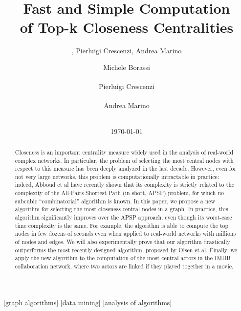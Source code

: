 \documentclass{acm_proc_article-sp}
\date{\today}
\begin{document}
\title{Fast and Simple Computation \\ of Top-k Closeness Centralities}
\author{, Pierluigi Crescenzi, Andrea Marino}

\author{
Michele Borassi\\
       \\
        Pierluigi Crescenzi\\
       \\
 Andrea Marino\\
       \\
}

\maketitle

\begin{abstract}
Closeness is an important centrality measure widely used in the analysis of real-world complex networks. In particular, the problem of selecting the  most central nodes with respect to this measure has been deeply analyzed in the last decade. However, even for not very large networks, this problem is computationally intractable in practice: indeed, Abboud et al have recently shown that its complexity is strictly related to the complexity of the All-Pairs Shortest Path (in short, APSP) problem, for which no subcubic ``combinatorial'' algorithm is known. In this paper, we propose a new algorithm for selecting the  most closeness central nodes in a graph. In practice, this algorithm significantly improves over the APSP approach, even though its worst-case time complexity is the same. For example, the algorithm is able to compute the top  nodes in few dozens of seconds even when applied to real-world networks with millions of nodes and edges. We will also experimentally prove that our algorithm drastically outperforms the most recently designed algorithm, proposed by Olsen et al. Finally, we apply the new algorithm to the computation of the most central actors in the IMDB collaboration network, where two actors are linked if they played together in a movie. 
\end{abstract}

[graph algorithms]
[data mining]
[analysis of algorithms]
\end{document}
